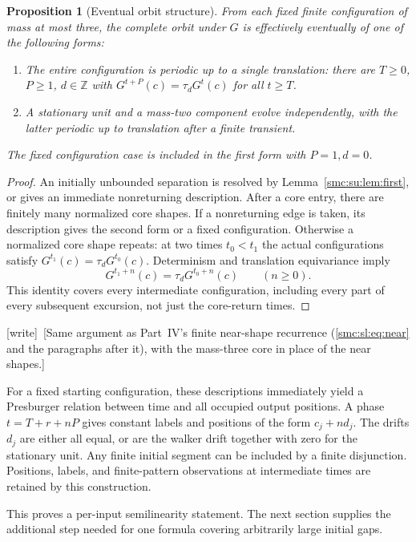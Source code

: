 \documentclass[11pt,letterpaper]{article}
\numberwithin{equation}{section}
\newtheorem{proposition}[theorem]{Proposition}
\theoremstyle{definition}
\theoremstyle{remark}
\newcommand{\Z}{\mathbb Z}
\newcommand{\wtag}{\textup{[write]}}
\begin{document}
\begin{proposition}[Eventual orbit structure]\label{smc:su:prop:orbits}
From each fixed finite configuration of mass at most three, the complete orbit
under $G$ is effectively eventually of one of the following forms:
\begin{enumerate}
\item The entire configuration is periodic up to a single translation:
there are $T\ge0$, $P\ge1$, $d\in\Z$ with
$G^{t+P}(c)=\tau_d G^t(c)$ for all $t\ge T$.
\item A stationary unit and a mass-two component evolve independently,
with the latter periodic up to translation after a finite transient.
\end{enumerate}
The fixed configuration case is included in the first form with $P=1,d=0$.
\end{proposition}
\begin{proof}
An initially unbounded separation is resolved by Lemma~\ref{smc:su:lem:first}, or gives
an immediate nonreturning description. After a core entry, there are finitely
many normalized core shapes. If a nonreturning edge is taken, its description
gives the second form or a fixed configuration. Otherwise a normalized core
shape repeats: at two times $t_0<t_1$ the actual configurations satisfy
$G^{t_1}(c)=\tau_d G^{t_0}(c)$. Determinism and translation equivariance imply
\[
 G^{t_1+n}(c)=\tau_d G^{t_0+n}(c)\qquad(n\ge0).
\]
This identity covers every intermediate configuration, including every part
of every subsequent excursion, not just the core-return times.
\end{proof}
\wtag\ [Same argument as Part~IV's finite near-shape recurrence (\eqref{smc:sl:eq:near} and the paragraphs after it), with the mass-three core in place of the near shapes.]

For a fixed starting configuration, these descriptions immediately yield a
Presburger relation between time and all occupied output positions. A phase
$t=T+r+nP$ gives constant labels and positions of the form $c_j+nd_j$.
The drifts $d_j$ are either all equal, or are the walker drift together with
zero for the stationary unit. Any finite initial segment can be included by a
finite disjunction. Positions, labels, and finite-pattern observations at
intermediate times are retained by this construction.

This proves a per-input semilinearity statement. The next section supplies the
additional step needed for one formula covering arbitrarily large initial gaps.
\end{document}
